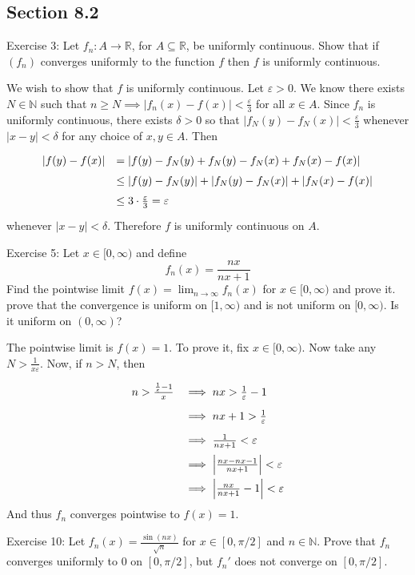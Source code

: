 \documentclass[11pt]{article}
\newcommand{\N}{\mathbb{N}}
\newcommand{\R}{\mathbb{R}}
\begin{document}
\subsection*{Section 8.2}

Exercise 3: Let $f_n:A\to\R$, for $A\subseteq\R$, be uniformly continuous. Show that
if $(f_n)$ converges uniformly to the function $f$ then $f$ is uniformly continuous.

We wish to show that $f$ is uniformly continuous. Let $\varepsilon>0$. We know
there exists $N\in\N$ such that $n\geq N\implies
|f_n(x)-f(x)|<\frac{\varepsilon}{3}$ for all $x\in A$. Since $f_n$ is uniformly
continuous, there exists $\delta>0$ so that
$|f_N(y)-f_N(x)|<\frac{\varepsilon}{3}$ whenever $|x-y|<\delta$ for any choice of
$x,y\in A$. Then
\[
\def\arraystretch{1.5}
\begin{array}{rl}
|f(y)-f(x)| &= |f(y)-f_N(y)+f_N(y)-f_N(x)+f_N(x)-f(x)| \\
&\leq |f(y)-f_N(y)|+|f_N(y)-f_N(x)|+|f_N(x)-f(x)| \\
&\leq 3\cdot\frac{\varepsilon}{3}=\varepsilon
\end{array}
\]
whenever $|x-y|<\delta$. Therefore $f$ is uniformly continuous on $A$.

Exercise 5: Let $x\in[0,\infty)$ and define
\[
f_n(x)=\frac{nx}{nx+1}
\]
Find the pointwise limit $f(x)=\lim_{n\to\infty} f_n(x)$ for $x\in[0,\infty)$ and prove it.
prove that the convergence is uniform on $[1,\infty)$ and is not uniform
on $[0,\infty)$. Is it uniform on $(0,\infty)$?

The pointwise limit is $f(x)=1$. To prove it, fix $x\in[0,\infty)$. Now take any
$N>\frac{1}{x\varepsilon}$. Now, if $n>N$, then 
\[
\def\arraystretch{1.8}
\begin{array}{rl}
n>\frac{\frac{1}{\varepsilon}-1}{x} &\implies nx> \frac{1}{\varepsilon}-1 \\
&\implies nx+1>\frac{1}{\varepsilon} \\
&\implies \frac{1}{nx+1} < \varepsilon \\
&\implies \left| \frac{nx-nx-1}{nx+1}\right|<\varepsilon \\
&\implies \left| \frac{nx}{nx+1}-1 \right|<\varepsilon
\end{array}
\]
And thus $f_n$ converges pointwise to $f(x)=1$.

Exercise 10: Let $f_n(x)=\frac{\sin(nx)}{\sqrt{n}}$ for $x\in[0,\pi/2]$ and $n\in\N$.
Prove that $f_n$ converges uniformly to 0 on $[0,\pi/2]$, but $f_n'$ does not
converge on $[0,\pi/2]$.
\end{document}
